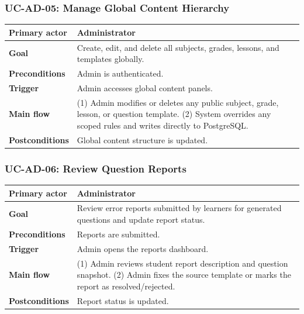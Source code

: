 \subsubsection{UC-AD-05: Manage Global Content Hierarchy}
\begin{longtable}{L{0.28\textwidth}L{0.62\textwidth}}
\textbf{Primary actor} & Administrator \\ \hline
\textbf{Goal} & Create, edit, and delete all subjects, grades, lessons, and templates globally. \\ \hline
\textbf{Preconditions} & Admin is authenticated. \\ \hline
\textbf{Trigger} & Admin accesses global content panels. \\ \hline
\textbf{Main flow} & (1) Admin modifies or deletes any public subject, grade, lesson, or question template. (2) System overrides any scoped rules and writes directly to PostgreSQL. \\ \hline
\textbf{Postconditions} & Global content structure is updated. \\
\end{longtable}

\subsubsection{UC-AD-06: Review Question Reports}
\begin{longtable}{L{0.28\textwidth}L{0.62\textwidth}}
\textbf{Primary actor} & Administrator \\ \hline
\textbf{Goal} & Review error reports submitted by learners for generated questions and update report status. \\ \hline
\textbf{Preconditions} & Reports are submitted. \\ \hline
\textbf{Trigger} & Admin opens the reports dashboard. \\ \hline
\textbf{Main flow} & (1) Admin reviews student report description and question snapshot. (2) Admin fixes the source template or marks the report as resolved/rejected. \\ \hline
\textbf{Postconditions} & Report status is updated. \\
\end{longtable}


